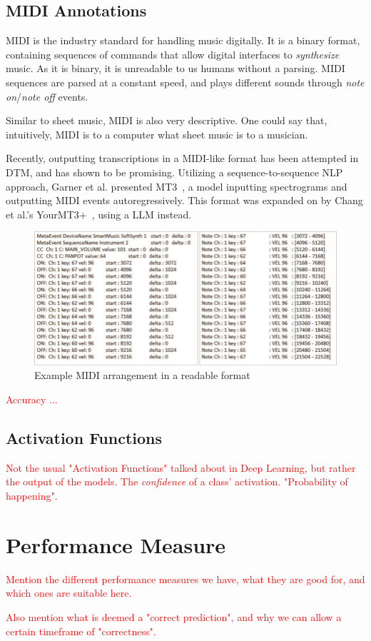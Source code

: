 \subsection{MIDI Annotations}

\gls{MIDI} is the industry standard for handling music digitally. It is a binary format, containing sequences of commands that allow digital interfaces to \textit{synthesize} music. As it is binary, it is unreadable to us humans without a parsing. \gls{MIDI} sequences are parsed at a constant speed, and plays different sounds through \textit{note on}/\textit{note off} events.

Similar to sheet music, \gls{MIDI} is also very descriptive. One could say that, intuitively, \gls{MIDI} is to a computer what sheet music is to a musician.

Recently, outputting transcriptions in a \gls{MIDI}-like format has been attempted in \gls{DTM}, and has shown to be promising. Utilizing a sequence-to-sequence \gls{NLP} approach, Garner et al. presented MT3~\cite{gardner2022mt3multitaskmultitrackmusic}, a model inputting spectrograms and outputting \gls{MIDI} events autoregressively. This format was expanded on by Chang et al.'s YourMT3+~\cite{chang2024yourmt3multiinstrumentmusictranscription}, using a \gls{LLM} instead.

\begin{figure}[H]
    \centering
    \includegraphics[scale=0.5, trim={0 0 13.8cm 0},clip]{figures/midi}
    \caption{Example MIDI arrangement in a readable format}
    \label{MIDIFigure}
\end{figure}

\textcolor{red}{Accuracy ...}

\subsection{Activation Functions}

\textcolor{red}{Not the usual "Activation Functions" talked about in Deep Learning, but rather the output of the models. The \textit{confidence} of a class' activation. "Probability of happening".}

\section{Performance Measure}

\textcolor{red}{Mention the different performance measures we have, what they are good for, and which ones are suitable here.}

\textcolor{red}{Also mention what is deemed a "correct prediction", and why we can allow a certain timeframe of "correctness".}